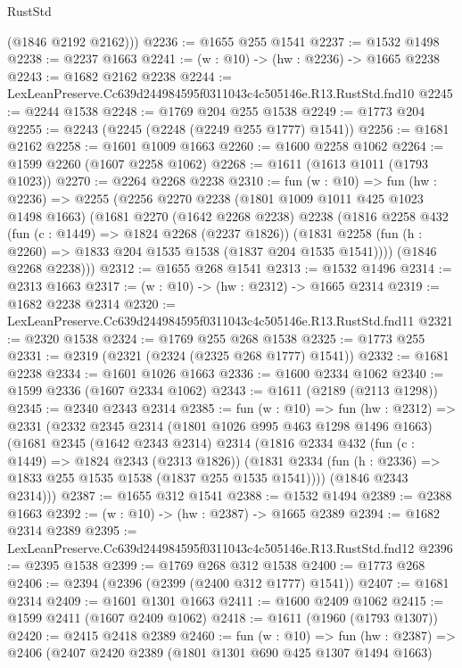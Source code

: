 \begin{lexlean}{RustStd}
\begin{coremodule}
        (@1846 @2192 @2162)))
@2236 := @1655 @255 @1541
@2237 := @1532 @1498
@2238 := @2237 @1663
@2241 := (w : @10) -> (hw : @2236) -> @1665 @2238
@2243 := @1682 @2162 @2238
@2244 := LexLeanPreserve.Cc639d244984595f0311043c4c505146e.R13.RustStd.fnd10
@2245 := @2244 @1538
@2248 := @1769 @204 @255 @1538
@2249 := @1773 @204
@2255 := @2243 (@2245 (@2248 (@2249 @255 @1777) @1541))
@2256 := @1681 @2162
@2258 := @1601 @1009 @1663
@2260 := @1600 @2258 @1062
@2264 := @1599 @2260 (@1607 @2258 @1062)
@2268 := @1611 (@1613 @1011 (@1793 @1023))
@2270 := @2264 @2268 @2238
@2310 := fun (w : @10) =>
  fun (hw : @2236) =>
  @2255
    (@2256
      @2270
      @2238
      (@1801 @1009 @1011 @425 @1023 @1498 @1663)
      (@1681
        @2270
        (@1642 @2268 @2238)
        @2238
        (@1816
          @2258
          @432
          (fun (c : @1449) => @1824 @2268 (@2237 @1826))
          (@1831 @2258 (fun (h : @2260) => @1833 @204 @1535 @1538 (@1837 @204 @1535 @1541))))
        (@1846 @2268 @2238)))
@2312 := @1655 @268 @1541
@2313 := @1532 @1496
@2314 := @2313 @1663
@2317 := (w : @10) -> (hw : @2312) -> @1665 @2314
@2319 := @1682 @2238 @2314
@2320 := LexLeanPreserve.Cc639d244984595f0311043c4c505146e.R13.RustStd.fnd11
@2321 := @2320 @1538
@2324 := @1769 @255 @268 @1538
@2325 := @1773 @255
@2331 := @2319 (@2321 (@2324 (@2325 @268 @1777) @1541))
@2332 := @1681 @2238
@2334 := @1601 @1026 @1663
@2336 := @1600 @2334 @1062
@2340 := @1599 @2336 (@1607 @2334 @1062)
@2343 := @1611 (@2189 (@2113 @1298))
@2345 := @2340 @2343 @2314
@2385 := fun (w : @10) =>
  fun (hw : @2312) =>
  @2331
    (@2332
      @2345
      @2314
      (@1801 @1026 @995 @463 @1298 @1496 @1663)
      (@1681
        @2345
        (@1642 @2343 @2314)
        @2314
        (@1816
          @2334
          @432
          (fun (c : @1449) => @1824 @2343 (@2313 @1826))
          (@1831 @2334 (fun (h : @2336) => @1833 @255 @1535 @1538 (@1837 @255 @1535 @1541))))
        (@1846 @2343 @2314)))
@2387 := @1655 @312 @1541
@2388 := @1532 @1494
@2389 := @2388 @1663
@2392 := (w : @10) -> (hw : @2387) -> @1665 @2389
@2394 := @1682 @2314 @2389
@2395 := LexLeanPreserve.Cc639d244984595f0311043c4c505146e.R13.RustStd.fnd12
@2396 := @2395 @1538
@2399 := @1769 @268 @312 @1538
@2400 := @1773 @268
@2406 := @2394 (@2396 (@2399 (@2400 @312 @1777) @1541))
@2407 := @1681 @2314
@2409 := @1601 @1301 @1663
@2411 := @1600 @2409 @1062
@2415 := @1599 @2411 (@1607 @2409 @1062)
@2418 := @1611 (@1960 (@1793 @1307))
@2420 := @2415 @2418 @2389
@2460 := fun (w : @10) =>
  fun (hw : @2387) =>
  @2406
    (@2407
      @2420
      @2389
      (@1801 @1301 @690 @425 @1307 @1494 @1663)

\end{coremodule}
\end{lexlean}
